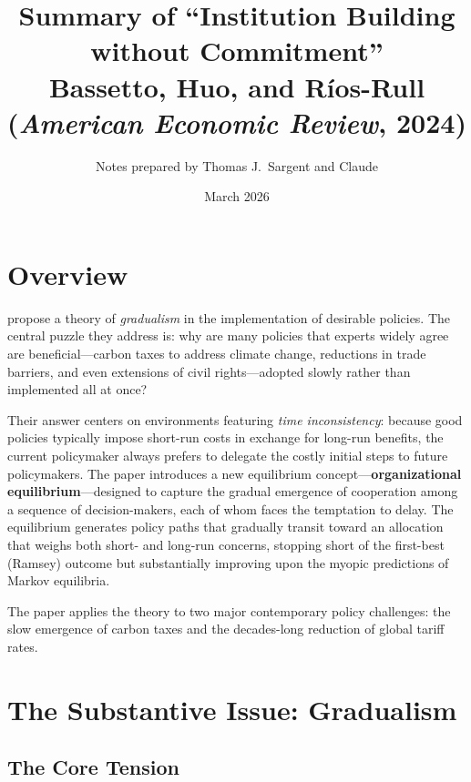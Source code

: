 \documentclass[12pt]{article}
\title{Summary of ``Institution Building without Commitment'' \\
\large Bassetto, Huo, and R\'ios-Rull (\textit{American Economic Review}, 2024)}
\author{Notes prepared by Thomas J.\ Sargent and Claude}
\date{March 2026}
\begin{document}
\maketitle

\tableofcontents

\bigskip

\section{Overview}

\citet{bassetto2024institution} propose a theory of \emph{gradualism} in the implementation of
desirable policies.  The central puzzle they address is: why are many policies that experts
widely agree are beneficial---carbon taxes to address climate change, reductions in
trade barriers, and even extensions of civil rights---adopted slowly rather than
implemented all at once?

Their answer centers on environments featuring \emph{time inconsistency}: because
good policies typically impose short-run costs in exchange for long-run benefits,
the current policymaker always prefers to delegate the costly initial steps to
future policymakers.  The paper introduces a new equilibrium concept---\textbf{organizational
equilibrium}---designed to capture the gradual emergence of cooperation among a
sequence of decision-makers, each of whom faces the temptation to delay.  The
equilibrium generates policy paths that gradually transit toward an allocation
that weighs both short- and long-run concerns, stopping short of the first-best
(Ramsey) outcome but substantially improving upon the myopic predictions of
Markov equilibria.

The paper applies the theory to two major contemporary policy challenges: the
slow emergence of carbon taxes and the decades-long reduction of global tariff
rates.


\section{The Substantive Issue: Gradualism}

\subsection{The Core Tension}
\end{document}

